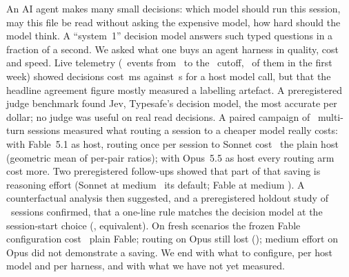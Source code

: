 \small
\noindent An AI agent makes many small decisions: which model should run this session, may this file be read without
asking the expensive model, how hard should the model think. A ``system~1'' decision model answers such typed
questions in a fraction of a second. We asked what one buys an agent harness in quality, cost and speed. Live
telemetry (\ObEvents\ events from \ObWeekStart\ to the \ObCutoff\ cutoff, \ObWeekEvents\ of them in the first week) showed decisions cost \ObJevPfifty\,ms against \ObHostPfifty\,s for a host model call,
but that the headline agreement figure mostly measured a labelling artefact. A preregistered judge benchmark found Jev,
Typesafe's decision model, the most accurate per dollar; no judge was useful on real read decisions. A paired campaign
of \NSessions\ multi-turn sessions measured what routing a session to a cheaper model really costs: with Fable~5.1 as
host, routing once per session to Sonnet cost \CfFableStickyPairTwo\X\ the plain host (geometric mean of per-pair
ratios); with Opus~5.5 as host every routing arm cost more. Two preregistered follow-ups showed that part of that
saving is reasoning effort (Sonnet at medium \EcRatio\X\ its default; Fable at medium \EfRatio\X). A counterfactual
analysis then suggested, and a preregistered holdout study of \SOneSessions\ sessions confirmed, that a one-line rule
matches the decision model at the session-start choice (\SHTwoRatio\X, equivalent). On fresh scenarios the frozen Fable
configuration cost \SHOneRatio\X\ plain Fable; routing on Opus still lost (\SHFiveRatio\X); medium effort on Opus did not demonstrate a saving. We end with what to configure, per host model and per harness, and with what we have not yet measured.
\normalsize
